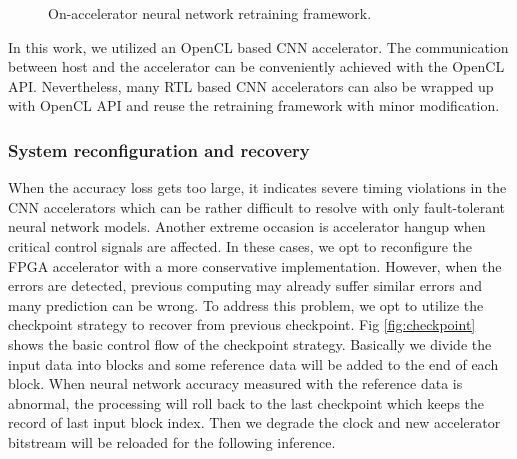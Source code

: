 \begin{figure}
    \caption{On-accelerator neural network retraining framework.}
\label{fig:retrain}
\vspace{-1em}
\end{figure}


In this work, we utilized an OpenCL based CNN accelerator. The communication between 
host and the accelerator can be conveniently achieved with the OpenCL API. 
Nevertheless, many RTL based CNN accelerators can also be wrapped up with 
OpenCL API and reuse the retraining framework with minor modification.

\subsubsection{System reconfiguration and recovery}
When the accuracy loss gets too large, it indicates severe timing 
violations in the CNN accelerators which can be rather difficult to resolve with 
only fault-tolerant neural network models. Another extreme occasion is 
accelerator hangup when critical control signals are affected. In these cases, we 
opt to reconfigure the FPGA accelerator with a more conservative implementation.
However, when the errors are detected, previous computing may already suffer 
similar errors and many prediction can be wrong. To address this problem, we opt to 
utilize the checkpoint strategy to recover from previous checkpoint. 
Fig \ref{fig:checkpoint} shows the basic control flow of the checkpoint strategy.
Basically we divide the input data into blocks and some reference data 
will be added to the end of each block. When neural network accuracy measured with 
the reference data is abnormal, the processing will roll back to the last checkpoint 
which keeps the record of last input block index. Then we degrade the clock and 
new accelerator bitstream will be reloaded for the following inference.



